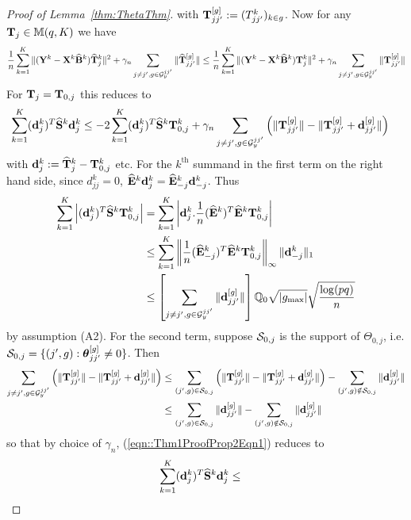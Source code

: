 \begin{proof}[Proof of Lemma~\ref{thm:ThetaThm}]
%
with ${\mathbf{T}}_{jj'}^{[g]} := (T_{jj'}^k)_{k \in g}$. Now for any ${\mathbf{T}}_j \in {\mathbb{M}}(q, K)$ we have
%
$$
\frac{1}{n} \sum_{k=1}^K \| ({\mathbf{Y}}^k - {\mathbf{X}}^k \widehat {{\mathbf{B}}}^k) \widehat {{\mathbf{T}}}_j^k \|^2 + \gamma_n \sum_{j \neq j', g \in {\cal{G}}_y^{jj'}} \| \widehat {{\mathbf{T}}}_{jj'}^{[g]} \| \leq
\frac{1}{n} \sum_{k=1}^K \| ({\mathbf{Y}}^k - {\mathbf{X}}^k \widehat {{\mathbf{B}}}^k) {\mathbf{T}}_j^k \|^2 + \gamma_n \sum_{j \neq j', g \in {\cal{G}}_y^{jj'}} \| {\mathbf{T}}_{jj'}^{[g]} \|
$$
%
For ${\mathbf{T}}_j = {\mathbf{T}}_{0,j}$ this reduces to
%
\begin{align}\label{eqn::Thm1ProofProp2Eqn1}
\sum_{k=1}^K ({\bf{d}}_j^k)^T \widehat {{\mathbf{S}}}^k {\bf{d}}_j^k & \leq - 2 \sum_{k=1}^K ({\bf{d}}_j^k)^T \widehat {{\mathbf{S}}}^k {\mathbf{T}}_{0,j}^k + \gamma_n \sum_{j \neq j', g \in {\cal{G}}_y^{jj'}} \left( \| {\mathbf{T}}_{jj'}^{[g]} \| -  \| {\mathbf{T}}_{jj'}^{[g]} + {\bf{d}}_{jj'}^{[g]}\| \right)
\end{align}
%
with ${\bf{d}}_{j}^k := \widehat {{\mathbf{T}}}_j^k - {\mathbf{T}}_{0,j}^k$ etc. For the $k^\text{th}$ summand in the first term on the right hand side, since $d_{jj}^k = 0$, $\widehat {{\mathbf{E}}}^k {\bf{d}}_j^k = \widehat {{\mathbf{E}}}_{-j}^k {\bf{d}}_{-j}^k$. Thus
%
\begin{align*}
\sum_{k=1}^K \left| ({\bf{d}}_j^k)^T \widehat {{\mathbf{S}}}^k {\mathbf{T}}_{0,j}^k \right| &=
\sum_{k=1}^K \left| {\bf{d}}_j^k. \frac{1}{n} (\widehat {{\mathbf{E}}}^k)^T \widehat {{\mathbf{E}}}^k {\mathbf{T}}_{0,j}^k \right| \\
& \leq \sum_{k=1}^K \left\| \frac{1}{n} (\widehat {{\mathbf{E}}}_{-j}^k)^T \widehat {{\mathbf{E}}}^k {\mathbf{T}}_{0,j}^k \right\|_\infty \| {\bf{d}}_{-j}^k \|_1 \\
& \leq \left[ \sum_{j \neq j', g \in {\cal{G}}_y^{jj'}} \| {\bf{d}}_{jj'}^{[g]} \| \right]
{\mathbb{Q}}_0 \sqrt {| g_{\max}|} \sqrt{ \frac{\log (pq)}{n}}
\end{align*}
%
by assumption (A2). For the second term, suppose ${\cal{S}}_{0,j}$ is the support of $\Theta_{0,j}$, i.e. ${\cal{S}}_{0,j} = \{ (j',g): {\boldsymbol{\theta}}_{jj'}^{[g]} \neq 0 \}$. Then
%
\begin{align*}
\sum_{j \neq j', g \in {\cal{G}}_y^{jj'}} \left( \| {\mathbf{T}}_{jj'}^{[g]} \| -  \| {\mathbf{T}}_{jj'}^{[g]} + {\bf{d}}_{jj'}^{[g]}\| \right) & \leq
\sum_{(j',g) \in {\cal{S}}_{0,j}} \left( \| {\mathbf{T}}_{jj'}^{[g]} \| -  \| {\mathbf{T}}_{jj'}^{[g]} + {\bf{d}}_{jj'}^{[g]}\| \right) -
\sum_{(j',g) \notin {\cal{S}}_{0,j}} \| {\bf{d}}_{jj'}^{[g]} \|\\
& \leq \sum_{(j',g) \in {\cal{S}}_{0,j}} \| {\bf{d}}_{jj'}^{[g]} \| - \sum_{(j',g) \notin {\cal{S}}_{0,j}} \| {\bf{d}}_{jj'}^{[g]} \|
\end{align*}
%
so that by choice of $\gamma_n$, (\ref{eqn::Thm1ProofProp2Eqn1}) reduces to
%
\begin{align}\label{eqn:Thm1ProofProp2Eqn3}
\sum_{k=1}^K (\bfd_j^k)^T \widehat \bfS^k \bfd_j^k & \leq 

\end{align}
\end{proof}
